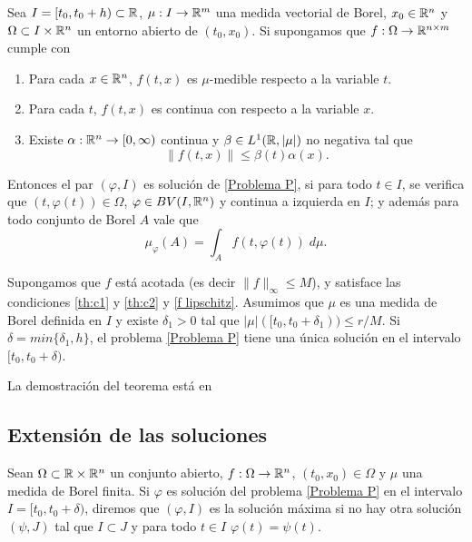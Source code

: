  
 \begin{defi}\label{def:sol}
 Sea $I=[t_0,t_0+h)\subset \mathbb{R}$, $\mu:I\to \mathbb{R}^m$  una medida vectorial de Borel, $x_0\in \mathbb{R}^n$  y $\Omega\subset I\times\mathbb{R}^n$ un entorno abierto de $(t_0,x_0)$. Si supongamos  que $f:\Omega\to \mathbb{R}^{n\times m}$ cumple con
 	\begin{enumerate}[label=\upshape(\Roman*),ref=(\Roman*)]
 		\item\label{th:c1} Para cada $x\in\mathbb{R}^n$, $f(t,x)$ es $\mu$-medible respecto a la variable $t$. 
 		\item\label{th:c2} Para cada $t$, $f(t,x)$ es continua con respecto  a  la variable $x$.
 		\item\label{th:c3} Existe $\alpha:\mathbb{R}^n\to[0,\infty)$ continua y $\beta\in L^1(\mathbb{R},|\mu|)$ no negativa tal que 
 		$$\left\| f(t,x)\right\|\leq \beta(t)\alpha(x) .$$
 	\end{enumerate}
 	 Entonces el par $(\varphi,I)$ es solución de \eqref{Problema P}, si para todo $t\in I$,  se verifica que $(t,\varphi(t))\in \Omega$,  $\varphi\in BV(I,\mathbb{R}^n)$ y continua a izquierda en $I$; y además para todo conjunto de Borel $A$ vale que 
 	$$\mu_{\varphi}(A)=\int_{A}f(t,\varphi(t))\; d\mu.$$ 
 \end{defi}
















\begin{thm} 
	\label{P-L}
	Supongamos que $f$ está acotada (es decir $\|f\|_{\infty}\leq M$), y satisface las condiciones \ref{th:c1} y \ref{th:c2} y \eqref{f lipschitz}. Asumimos que $\mu$ es una medida de Borel definida en $I$ y existe $\delta_1>0$ tal que $|\mu|([t_0,t_0+\delta_1))\leq r/M$. Si $\delta=min\{\delta_1, h\}$, el problema \eqref{Problema P} tiene una única solución en el intervalo $[t_0, t_0+\delta)$.
	
\end{thm}
 
 La demostración del teorema está en \cite[Teorema 4.1]{P.Mazzone}
 
 \subsection{Extensión de las soluciones}
 \begin{defi} 
 	Sean $\Omega\subset\mathbb{R}\times\mathbb{R}^n$ un conjunto abierto, $f:\Omega\to\mathbb{R}^n$, $(t_0,x_0)\in\Omega$ y $\mu$ una medida de Borel finita. Si $\varphi$ es solución del problema \eqref{Problema P} en el intervalo $I=[t_0,t_0+\delta)$, diremos que $(\varphi,I)$ es la solución máxima si no hay otra solución $(\psi,J)$ tal que $I\subset J$ y para todo $t\in I$ $\varphi(t)=\psi(t)$.
 \end{defi}

